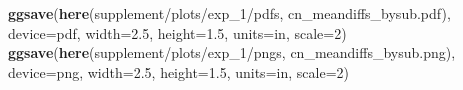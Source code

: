 \documentclass[
  doc,floatsintext]{apa6}
\newenvironment{Shaded}{\begin{snugshade}}{\end{snugshade}}
\newcommand{\AttributeTok}[1]{\textcolor[rgb]{0.13,0.29,0.53}{#1}}
\newcommand{\DecValTok}[1]{\textcolor[rgb]{0.00,0.00,0.81}{#1}}
\newcommand{\FloatTok}[1]{\textcolor[rgb]{0.00,0.00,0.81}{#1}}
\newcommand{\FunctionTok}[1]{\textcolor[rgb]{0.13,0.29,0.53}{\textbf{#1}}}
\newcommand{\NormalTok}[1]{#1}
\newcommand{\StringTok}[1]{\textcolor[rgb]{0.31,0.60,0.02}{#1}}
\begin{document}
\begin{Shaded}
\begin{Highlighting}[]
\FunctionTok{ggsave}\NormalTok{(}\FunctionTok{here}\NormalTok{(}\StringTok{\textquotesingle{}supplement/plots/exp\_1/pdfs\textquotesingle{}}\NormalTok{, }\StringTok{\textquotesingle{}cn\_meandiffs\_bysub.pdf\textquotesingle{}}\NormalTok{),}
       \AttributeTok{device=}\StringTok{\textquotesingle{}pdf\textquotesingle{}}\NormalTok{, }\AttributeTok{width=}\FloatTok{2.5}\NormalTok{, }\AttributeTok{height=}\FloatTok{1.5}\NormalTok{, }\AttributeTok{units=}\StringTok{\textquotesingle{}in\textquotesingle{}}\NormalTok{, }\AttributeTok{scale=}\DecValTok{2}\NormalTok{)}
\FunctionTok{ggsave}\NormalTok{(}\FunctionTok{here}\NormalTok{(}\StringTok{\textquotesingle{}supplement/plots/exp\_1/pngs\textquotesingle{}}\NormalTok{, }\StringTok{\textquotesingle{}cn\_meandiffs\_bysub.png\textquotesingle{}}\NormalTok{), }
       \AttributeTok{device=}\StringTok{\textquotesingle{}png\textquotesingle{}}\NormalTok{, }\AttributeTok{width=}\FloatTok{2.5}\NormalTok{, }\AttributeTok{height=}\FloatTok{1.5}\NormalTok{, }\AttributeTok{units=}\StringTok{\textquotesingle{}in\textquotesingle{}}\NormalTok{, }\AttributeTok{scale=}\DecValTok{2}\NormalTok{)}
\end{Highlighting}
\end{Shaded}
\end{document}
